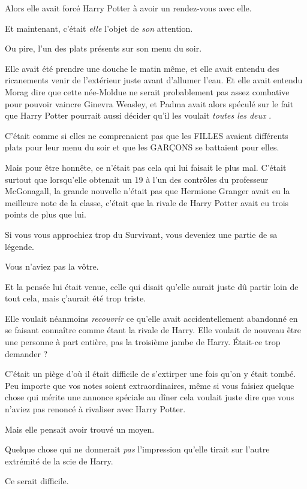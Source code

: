 Alors elle avait forcé Harry Potter à avoir un rendez-vous avec elle.

Et maintenant, c'était \emph{elle}  l'objet de \emph{son}  attention.

Ou pire, l'un des plats présents sur son menu du soir.

Elle avait été prendre une douche le matin même, et elle avait entendu des ricanements venir de l'extérieur juste avant d'allumer l'eau. Et elle avait entendu Morag dire que cette née-Moldue ne serait probablement pas assez combative pour pouvoir vaincre Ginevra Weasley, et Padma avait alors spéculé sur le fait que Harry Potter pourrait aussi décider qu'il les voulait \emph{toutes les deux} .

C'était comme si elles ne comprenaient pas que les FILLES avaient différents plats pour leur menu du soir et que les GARÇONS se battaient pour elles.

Mais pour être honnête, ce n'était pas cela qui lui faisait le plus mal. C'était surtout que lorsqu'elle obtenait un 19 à l'un des contrôles du professeur McGonagall, la grande nouvelle n'était pas que Hermione Granger avait eu la meilleure note de la classe, c'était que la rivale de Harry Potter avait eu trois points de plus que lui.

Si vous vous approchiez trop du Survivant, vous deveniez une partie de sa légende.

Vous n'aviez pas la vôtre.

Et la pensée lui était venue, celle qui disait qu'elle aurait juste dû partir loin de tout cela, mais ç'aurait été trop triste.

Elle voulait néanmoins \emph{recouvrir}  ce qu'elle avait accidentellement abandonné en se faisant connaître comme étant la rivale de Harry. Elle voulait de nouveau être une personne à part entière, pas la troisième jambe de Harry. Était-ce trop demander ?

C'était un piège d'où il était difficile de s'extirper une fois qu'on y était tombé. Peu importe que vos notes soient extraordinaires, même si vous faisiez quelque chose qui mérite une annonce spéciale au dîner cela voulait juste dire que vous n'aviez pas renoncé à rivaliser avec Harry Potter.

Mais elle pensait avoir trouvé un moyen.

Quelque chose qui ne donnerait \emph{pas}  l'impression qu'elle tirait sur l'autre extrémité de la scie de Harry.

Ce serait difficile.

